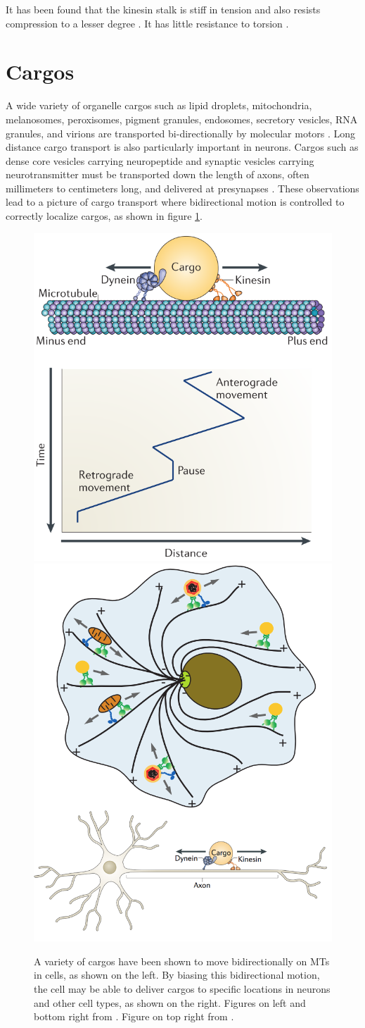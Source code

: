 It has been found that the kinesin stalk is stiff in tension \cite{Kojima1997} and also resists compression to a lesser degree \cite{Jeney2004}. It has little resistance to torsion \cite{Hunt1993,Gutierrez-Medina2009}.

\section{Cargos}

A wide variety of organelle cargos such as lipid droplets, mitochondria, melanosomes, peroxisomes, pigment granules, endosomes, secretory vesicles, RNA granules, and virions are transported bi-directionally by molecular motors \cite{Hancock2014,Gross2004}. Long distance cargo transport is also particularly important in neurons. Cargos such as dense core vesicles carrying neuropeptide and synaptic vesicles carrying neurotransmitter must be transported down the length of axons, often millimeters to centimeters long, and delivered at presynapses \cite{Maeder2014}. These observations lead to a picture of cargo transport where bidirectional motion is controlled to correctly localize cargos, as shown in figure \ref{fig:cargo_delivery}.

\begin{figure}
\centering
\includegraphics[width=.45 \textwidth]{background/bidirectional_motion}
\includegraphics[width=.45 \textwidth]{background/cargo_delivery}
\caption[Bidirectional motion and cargo delivery]{A variety of cargos have been shown to move bidirectionally on MTs in cells, as shown on the left. By biasing this bidirectional motion, the cell may be able to deliver cargos to specific locations in neurons and other cell types, as shown on the right. Figures on left and bottom right from \cite{Hancock2014}. Figure on top right from \cite{Gross2004}.}
\label{fig:cargo_delivery}
\end{figure}


